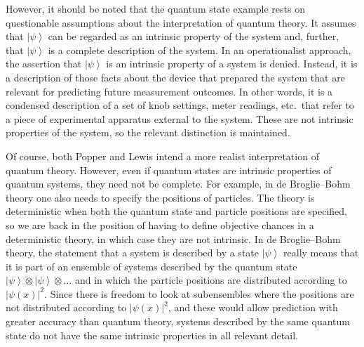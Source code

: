 \documentclass[DIV=calc,paper=a4,fontsize=11pt,twocolumn]{scrartcl} %
\theoremstyle{definition}
\theoremstyle{plain}
\newcommand{\Ket}[1]{\ensuremath{\left \vert #1 \right \rangle}}
\begin{document}
However, it should be noted that the quantum state example rests on
questionable assumptions about the interpretation of quantum theory.
It assumes that $\Ket{\psi}$ can be regarded as an intrinsic property
of the system and, further, that $\Ket{\psi}$ is a complete
description of the system.  In an operationalist approach, the
assertion that $\Ket{\psi}$ is an intrinsic property of a system is
denied.  Instead, it is a description of those facts about the device
that prepared the system that are relevant for predicting future
measurement outcomes.  In other words, it is a condensed description
of a set of knob settings, meter readings, etc.\ that refer to a piece
of experimental apparatus external to the system.  These are not
intrinsic properties of the system, so the relevant distinction is
maintained.

Of course, both Popper and Lewis intend a more realist interpretation
of quantum theory.  However, even if quantum states are intrinsic
properties of quantum systems, they need not be complete.  For
example, in de Broglie--Bohm theory one also needs to specify the
positions of particles.  The theory is deterministic when both the
quantum state and particle positions are specified, so we are back in
the position of having to define objective chances in a deterministic
theory, in which case they are not intrinsic.  In de Broglie--Bohm
theory, the statement that a system is described by a state
$\Ket{\psi}$ really means that it is part of an ensemble of systems
described by the quantum state $\Ket{\psi} \otimes \Ket{\psi} \otimes
\ldots$ and in which the particle positions are distributed according
to $\left | \psi(x) \right |^2$.  Since there is freedom to look at
subensembles where the positions are not distributed according to
$\left | \psi(x) \right |^2$, and these would allow prediction with
greater accuracy than quantum theory, systems described by the same
quantum state do not have the same intrinsic properties in all
relevant detail.
\end{document}
